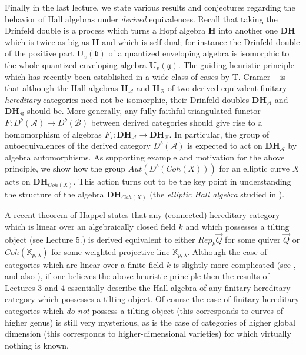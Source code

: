 \documentclass[a4paper,10pt]{amsart}
\def\H{\mathbf{H}}
\def\U{\mathbf{U}}
\numberwithin{equation}{section}
\begin{document}
\vspace{.1in}

Finally in the last lecture, we state various results and conjectures regarding the behavior of Hall algebras under \textit{derived} equivalences. Recall that taking the Drinfeld double is a process which turns a Hopf algebra $\H$ into another one $\mathbf{DH}$ which is twice as big as $\H$ and which is self-dual; for instance the Drinfeld double of the positive part $\U_v(\mathfrak{b})$ of a quantized enveloping algebra is isomorphic to the whole quantized enveloping algebra $\U_v(\mathfrak{g})$. The guiding heuristic principle --which has recently been established in a wide class of cases by T. Cramer \cite{Cramer}-- is that although the Hall algebras $\H_{\mathcal{A}}$ and $\H_{\mathcal{B}}$ of two derived equivalent finitary \textit{hereditary} categories need not be isomorphic, their Drinfeld doubles $\mathbf{D}\H_{\mathcal{A}}$ and $\mathbf{D}\H_{\mathcal{B}}$ should be. More generally, any fully faithful triangulated functor  $F:D^b(\mathcal{A}) \to D^b(\mathcal{B})$ between derived categories should give rise to a homomorphism of algebras ${F}_{\star}:\mathbf{D}\H_{\mathcal{A}} \to \mathbf{D}\H_{\mathcal{B}}$. In particular, the group of autoequivalences of the derived category $D^b(\mathcal{A})$ is expected to act on $\mathbf{DH}_{\mathcal{A}}$ by algebra automorphisms. As supporting example and motivation for the above principle, we show how the group $Aut(D^b(Coh(X)))$ for an elliptic curve $X$ acts on $\mathbf{DH}_{Coh(X)}$. This action turns out to be the key point in understanding the structure of the algebra $\mathbf{DH}_{Coh(X)}$ (the \textit{elliptic Hall algebra} studied in \cite{BS}).

\vspace{.1in}

A recent theorem of Happel \cite{Happel} states that any (connected) hereditary category which is linear over an algebraically closed field $k$ and which possesses a tilting object (see Lecture 5.) is derived equivalent to either ${Rep}_{k}\vec{Q}$ for some quiver $\vec{Q}$ or $Coh(\mathbb{X}_{p,\lambda})$ for some weighted projective line $\mathbb{X}_{p,\lambda}$.  Although the case of categories which are linear over a finite field $k$ is slightly more complicated (see \cite{ReitenHappel}, and also \cite{ReitenVdB}), if one believes the above heuristic principle then the results of Lectures 3 and 4 essentially describe the Hall algebra of any finitary hereditary category which possesses a tilting object. Of course the case of finitary hereditary categories which \textit{do not} possess a tilting object (this corresponds to curves of higher genus) is still very mysterious, as is the case of categories of higher global dimension (this corresponds to higher-dimensional varieties) for which virtually nothing is known.
\end{document}

